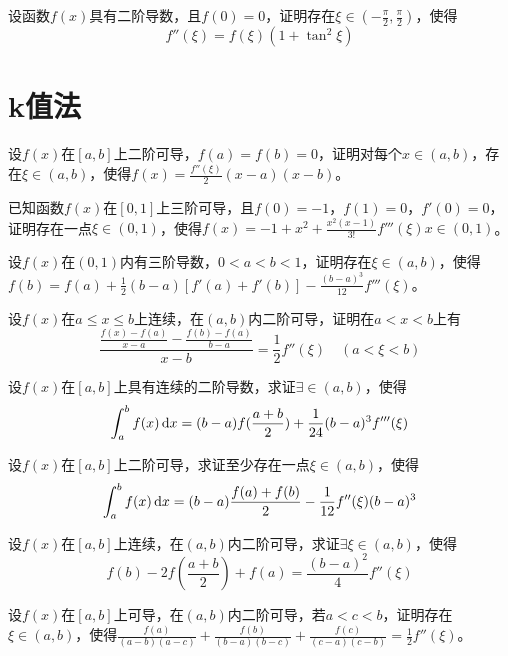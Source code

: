 \begin{example}
	设函数$f(x)$具有二阶导数，且$f(0)=0$，证明存在$\xi\in\left(-\frac{\pi}{2},\frac{\pi}{2}\right)$，使得\[f''(\xi)=f(\xi)(1+\tan^2\xi)\]
\end{example}

\section{k值法}

\begin{example}
	设$f(x)$在$[a,b]$上二阶可导，$f(a)=f(b)=0$，证明对每个$x\in(a,b)$，存在$\xi\in(a,b)$，使得$f(x)=\frac{f''(\xi)}{2}(x-a)(x-b)$。
\end{example}

\begin{example}
	已知函数$f(x)$在$[0,1]$上三阶可导，且$f(0)=-1$，$f(1)=0$，$f'(0)=0$，证明存在一点$\xi\in(0,1)$，使得$f(x)=-1+x^2+\frac{x^2(x-1)}{3!}f'''(\xi)x\in(0,1)$。
\end{example}

\begin{example}
	设$f(x)$在$(0,1)$内有三阶导数，$0<a<b<1$，证明存在$\xi\in(a,b)$，使得$f(b)=f(a)+\frac{1}{2}(b-a)[f'(a)+f'(b)]-\frac{(b-a)^3}{12}f'''(\xi)$。
\end{example}

\begin{example}
	设$f(x)$在$a\leqslant x\leqslant b$上连续，在$(a,b)$内二阶可导，证明在$a<x<b$上有\[\frac{\frac{f(x)-f(a)}{x-a}-\frac{f(b)-f(a)}{b-a}}{x-b}=\frac{1}{2}f''(\xi)\quad(a<\xi<b)\]
\end{example}

\begin{example}
	设$f(x)$在$[a,b]$上具有连续的二阶导数，求证$\exists\in(a,b)$，使得\[\int_{a}^{b}f(x)\,\mathrm{d} x=(b-a)f(\frac{a+b}{2})+\frac{1}{24}(b-a)^3f'''(\xi)\]
\end{example}

\begin{example}
	设$f(x)$在$[a,b]$上二阶可导，求证至少存在一点$\xi\in(a,b)$，使得\[\int_{a}^{b}f(x)\,\mathrm{d} x=(b-a)\frac{f(a)+f(b)}{2}-\frac{1}{12}f''(\xi)(b-a)^3\]
\end{example}

\begin{example}
	设$f(x)$在$[a,b]$上连续，在$(a,b)$内二阶可导，求证$\exists\xi\in(a,b)$，使得\[f(b)-2f(\frac{a+b}{2})+f(a)=\frac{(b-a)^2}{4}f''(\xi)\]
\end{example}

\begin{example}
	设$f(x)$在$[a,b]$上可导，在$(a,b)$内二阶可导，若$a<c<b$，证明存在$\xi\in(a,b)$，使得$\frac{f(a)}{(a-b)(a-c)}+\frac{f(b)}{(b-a)(b-c)}+\frac{f(c)}{(c-a)(c-b)}=\frac{1}{2}f''(\xi)$。
\end{example}

